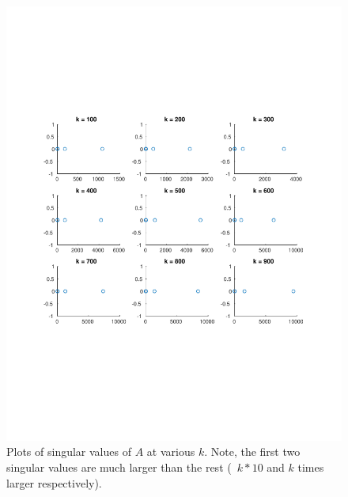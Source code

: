 \begin{figure}[t]
  \centering
  \includegraphics[trim=10mm 70mm 10mm 70mm, width=1.0\textwidth]{../q3_plots}
  \caption{Plots of singular values of \(A\) at various \(k\). Note, the first two singular values are much larger than the rest (~\(k*10\) and \(k\) times larger respectively).}
  \label{fig:q3_plots}
\end{figure}

\newpage


%
